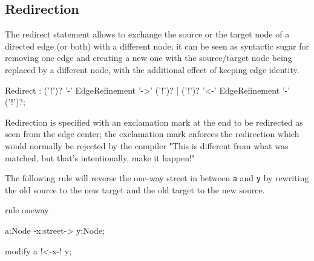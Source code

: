 \subsection{Redirection} \label{sec:redirect}
The redirect statement allows to exchange the source or the target node of a directed edge (or both) with a different node;
it can be seen as syntactic sugar for removing one edge and creating a new one with the source/target node being replaced by a different node, with the additional effect of keeping edge identity.

\begin{rail}
Redirect : ('!')? '-' EdgeRefinement '->' ('!')? | ('!')? '<-' EdgeRefinement '-' ('!')?;
\end{rail}

Redirection is specified with an exclamation mark at the end to be redirected as seen from the edge center;
the exclamation mark enforces the redirection which would normally be rejected by the compiler "This is different from what was matched, but that's intentionally, make it happen!"

\begin{example}
The following rule will reverse the one-way street in between \texttt{a} and \texttt{y} by rewriting the old source to the new target and the old target to the new source.
\begin{grgen}
rule oneway {
  a:Node -x:street-> y:Node;

  modify {
    a !<-x-! y;
  }
}
\end{grgen}
\end{example}


